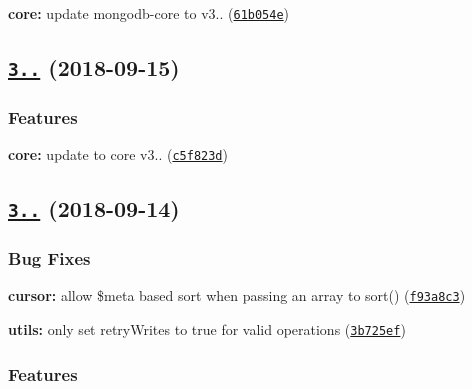 \begin{DoxyItemize}
\item {\bfseries core\+:} update mongodb-\/core to v3.. (\href{https://github.com/mongodb/node-mongodb-native/commit/61b054e}{\tt 61b054e})
\end{DoxyItemize}

\label{_3.1.6}%
 \subsection*{\href{https://github.com/mongodb/node-mongodb-native/compare/v3.1.5...v3.1.6}{\tt 3..} (2018-\/09-\/15)}

\subsubsection*{Features}


\begin{DoxyItemize}
\item {\bfseries core\+:} update to core v3.. (\href{https://github.com/mongodb/node-mongodb-native/commit/c5f823d}{\tt c5f823d})
\end{DoxyItemize}

\label{_3.1.5}%
 \subsection*{\href{https://github.com/mongodb/node-mongodb-native/compare/v3.1.4...v3.1.5}{\tt 3..} (2018-\/09-\/14)}

\subsubsection*{Bug Fixes}


\begin{DoxyItemize}
\item {\bfseries cursor\+:} allow {\ttfamily \$meta} based sort when passing an array to {\ttfamily sort()} (\href{https://github.com/mongodb/node-mongodb-native/commit/f93a8c3}{\tt f93a8c3})
\item {\bfseries utils\+:} only set retry\+Writes to true for valid operations (\href{https://github.com/mongodb/node-mongodb-native/commit/3b725ef}{\tt 3b725ef})
\end{DoxyItemize}

\subsubsection*{Features}


